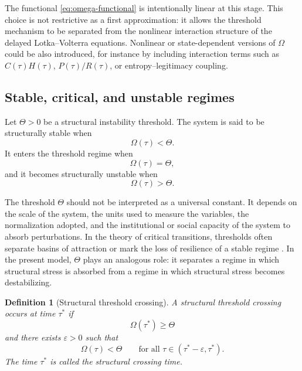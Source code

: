 \documentclass[11pt]{article}
\newcommand{\citep}{\cite}
\newtheorem{definition}{Definition}
\begin{document}
The functional \eqref{eq:omega-functional} is intentionally linear at this stage. This choice is not restrictive as a first approximation: it allows the threshold mechanism to be separated from the nonlinear interaction structure of the delayed Lotka--Volterra equations. Nonlinear or state-dependent versions of $\Omega$ could  be also introduced, for instance by including interaction terms such as $C(\tau)H(\tau)$, $P(\tau)/R(\tau)$, or entropy--legitimacy coupling. 

\subsection{Stable, critical, and unstable regimes}

Let
$
\Theta>0
$
be a structural instability threshold. The system is said to be structurally stable when
\begin{equation}
\label{eq:stable-regime}
\Omega(\tau)<\Theta.
\end{equation}
It enters the threshold regime when
\begin{equation}
\label{eq:threshold-regime}
\Omega(\tau)=\Theta,
\end{equation}
and it becomes structurally unstable when
\begin{equation}
\label{eq:unstable-regime}
\Omega(\tau)>\Theta.
\end{equation}

The threshold $\Theta$ should not be interpreted as a universal constant. It depends on the scale of the system, the units used to measure the variables, the normalization adopted, and the institutional or social capacity of the system to absorb perturbations. In the theory of critical transitions, thresholds often separate basins of attraction or mark the loss of resilience of a stable regime \citep{scheffer2009early,dakos2024tipping,rietkerk2025ambiguity}. In the present model, $\Theta$ plays an analogous role: it separates a regime in which structural stress is absorbed from a regime in which structural stress becomes destabilizing.

\begin{definition}[Structural threshold crossing]
	\label{def:threshold-crossing}
	A structural threshold crossing occurs at time $\tau^\ast$ if
	\begin{equation}
	\label{eq:crossing}
	\Omega(\tau^\ast)\geq \Theta
	\end{equation}
	and there exists $\varepsilon>0$ such that
	\begin{equation}
	\label{eq:left-stable}
	\Omega(\tau)<\Theta
	\qquad
	\text{for all } \tau\in(\tau^\ast-\varepsilon,\tau^\ast).
	\end{equation}
	The time $\tau^\ast$ is called the structural crossing time.
\end{definition}
\end{document}
